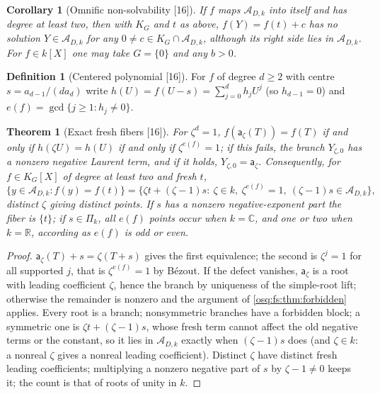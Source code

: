 \documentclass[11pt,letterpaper]{article}
\numberwithin{equation}{section}
\newtheorem{theorem}{Theorem}[section]
\newtheorem{corollary}[corollary]{Corollary}
\theoremstyle{definition}
\newtheorem{definition}[definition]{Definition}
\theoremstyle{remark}
\theoremstyle{plain}
\newcommand{\R}{\mathbb R}
\newcommand{\C}{\mathbb C}
\newcommand{\A}{\mathcal A}          %
\newcommand{\src}[1]{\textup{\textsf{[#1]}}}
\begin{document}
\begin{corollary}[Omnific non-solvability \src{16}]\label{osq:fs:cor:diophantine}
If $f$ maps $\A_{D,k}$ into itself and has degree at least two, then with $K_G$ and $t$ as above, $f(Y)=f(t)+c$ has no solution
$Y\in\A_{D,k}$ for any $0\ne c\in K_G\cap\A_{D,k}$, although its right side lies in $\A_{D,k}$. For $f\in k[X]$ one may take $G=\{0\}$ and any
$b>0$.
\end{corollary}

\begin{definition}[Centered polynomial \src{16}]\label{osq:fs:def:centered}
For $f$ of degree $d\ge2$ with centre $s=a_{d-1}/(da_d)$ write $h(U)=f(U-s)=\sum_{j=0}^dh_jU^j$ (so $h_{d-1}=0$) and
$e(f)=\gcd\{j\ge1:h_j\ne0\}$.
\end{definition}

\begin{theorem}[Exact fresh fibers \src{16}]\label{osq:fs:thm:fiber}
For $\zeta^d=1$, $f(\mathsf a_\zeta(T))=f(T)$ if and only if $h(\zeta U)=h(U)$ if and only if $\zeta^{e(f)}=1$; if this fails, the branch
$Y_{\zeta,0}$ has a nonzero negative Laurent term, and if it holds, $Y_{\zeta,0}=\mathsf a_\zeta$. Consequently, for $f\in K_G[X]$ of degree at
least two and fresh $t$,
\[
 \{y\in\A_{D,k}:f(y)=f(t)\}=\bigl\{\zeta t+(\zeta-1)s:\ \zeta\in k,\ \zeta^{e(f)}=1,\ (\zeta-1)s\in\A_{D,k}\bigr\},
\]
distinct $\zeta$ giving distinct points. If $s$ has a nonzero negative-exponent part the fiber is $\{t\}$; if $s\in\Pi_k$, all $e(f)$ points occur
when $k=\C$, and one or two when $k=\R$, according as $e(f)$ is odd or even.
\end{theorem}
\begin{proof}
$\mathsf a_\zeta(T)+s=\zeta(T+s)$ gives the first equivalence; the second is $\zeta^j=1$ for all supported $j$, that is $\zeta^{e(f)}=1$ by
B\'ezout. If the defect vanishes, $\mathsf a_\zeta$ is a root with leading coefficient $\zeta$, hence the branch by uniqueness of the simple-root
lift; otherwise the remainder is nonzero and the argument of \cref{osq:fs:thm:forbidden} applies. Every root is a branch; nonsymmetric branches
have a forbidden block; a symmetric one is $\zeta t+(\zeta-1)s$, whose fresh term cannot affect the old negative terms or the constant, so it lies in
$\A_{D,k}$ exactly when $(\zeta-1)s$ does (and $\zeta\in k$: a nonreal $\zeta$ gives a nonreal leading coefficient). Distinct $\zeta$ have distinct
fresh leading coefficients; multiplying a nonzero negative part of $s$ by $\zeta-1\ne0$ keeps it; the count is that of roots of unity in $k$.
\end{proof}
\end{document}
